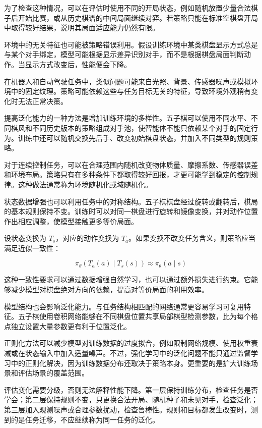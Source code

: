 \documentclass[UTF8,a4paper,zihao=-4,oneside,openany]{ctexbook}
\begin{document}
为了检查这种情况，可以在评估时使用不同的开局状态，例如随机放置少量合法棋子后开始比赛，或从历史棋谱的中间局面继续对弈。若策略只能在标准空棋盘开局中取得较好结果，说明其局面适应能力仍然有限。

环境中的无关特征也可能被策略错误利用。假设训练环境中某类棋盘显示方式总是与某个对手绑定，模型可能根据显示差异识别对手，而不是根据棋盘局面判断动作。当显示方式改变后，性能便会下降。

在机器人和自动驾驶任务中，类似问题可能来自光照、背景、传感器噪声或模拟环境中的固定纹理。策略可能依赖这些与任务目标无关的特征，导致环境外观稍有变化时无法正常决策。

提高泛化能力的一种方法是增加训练环境的多样性。五子棋可以使用不同水平、不同棋风和不同历史版本的策略组成对手池，使智能体不能只依赖某个对手的固定行为。训练中还可以随机交换先后手、改变初始棋盘状态，并加入不同类型的规则策略。

对于连续控制任务，可以在合理范围内随机改变物体质量、摩擦系数、传感器误差和环境布局。策略只有在多种条件下都取得较好回报，才更可能学到稳定的控制规律。这种做法通常称为环境随机化或域随机化。

状态数据增强也可以利用任务中的对称结构。五子棋棋盘经过旋转或翻转后，棋局的基本规则保持不变。训练时可以对同一棋盘进行旋转和镜像变换，并对动作位置作出相应调整，使模型接触更多等价局面。

设状态变换为 $T_s$，对应的动作变换为 $T_a$。如果变换不改变任务含义，则策略应当满足近似一致性：

\begin{equation}
\pi_{\theta}
\left(
T_a(a)\mid T_s(s)
\right)
\approx
\pi_{\theta}(a\mid s)
\end{equation}

这种一致性要求可以通过数据增强自然学习，也可以通过额外损失进行约束。它能够减少模型对棋盘绝对方向的依赖，提高对等价局面的利用效率。

模型结构也会影响泛化能力。与任务结构相匹配的网络通常更容易学习可复用特征。五子棋使用卷积网络能够在不同棋盘位置共享局部棋型检测参数，比为每个格点独立设置大量参数更有利于位置泛化。

正则化方法可以减少模型对训练数据的过度拟合，例如限制网络规模、使用权重衰减或在状态输入中加入适量噪声。不过，强化学习中的泛化问题不能只通过监督学习中的正则化解决，因为训练数据分布还取决于策略本身。更重要的是扩大训练场景和评估场景的覆盖范围。

评估变化需要分级，否则无法解释性能下降。第一层保持训练分布，检查任务是否学会；第二层保持规则不变，只更换合法开局、随机种子和未见对手，检查泛化；第三层加入观测噪声或合理参数扰动，检查鲁棒性。规则和目标都发生改变时，测到的是任务迁移，不应继续称为同一任务的泛化。
\end{document}
